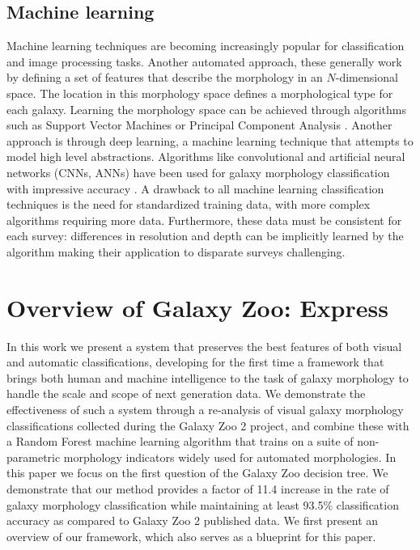 \subsection{Machine learning}
Machine learning techniques are becoming increasingly popular for classification and image processing tasks. Another automated approach, these generally work by defining a set of features that describe the morphology in an $N$-dimensional space. The location in this morphology space defines a morphological type for each galaxy. Learning the morphology space can be achieved through algorithms such as Support Vector Machines \citep{HuertasCompany2008} or Principal Component Analysis \citep{Watanabe1985, Scarlata2007}. Another approach is through deep learning, a machine learning technique that attempts to model high level abstractions. Algorithms like convolutional and artificial neural networks (CNNs, ANNs) have been used for galaxy morphology classification with impressive accuracy 
\citep{Ball2004, 
	Banerji2010, 
	Dieleman2015, 
	HuertasCompany2015}. 
A drawback to all machine learning classification techniques is the need for standardized training data, with more complex algorithms requiring more data. Furthermore, these data must be consistent for each survey: differences in resolution and depth can be implicitly learned by the algorithm making their application to disparate surveys challenging. 


\section{Overview of Galaxy Zoo: Express}

 In this work we present a system that preserves the best features of both visual and automatic classifications, developing for the first time a framework that brings both human and machine intelligence to the task of galaxy morphology to handle the scale and scope of next generation data. We demonstrate the effectiveness of such a system through a re-analysis of visual galaxy morphology classifications collected during the Galaxy Zoo 2 project, and combine these with a Random Forest machine learning algorithm that trains on a suite of non-parametric morphology indicators widely used for automated morphologies. In this paper we focus on the first question of the Galaxy Zoo decision tree. We demonstrate that our method provides a factor of 11.4 increase in the rate of galaxy morphology classification  while maintaining at least 93.5\% classification accuracy as compared to Galaxy Zoo 2 published data. We first present an overview of our framework, which also serves as a blueprint for this paper. 


